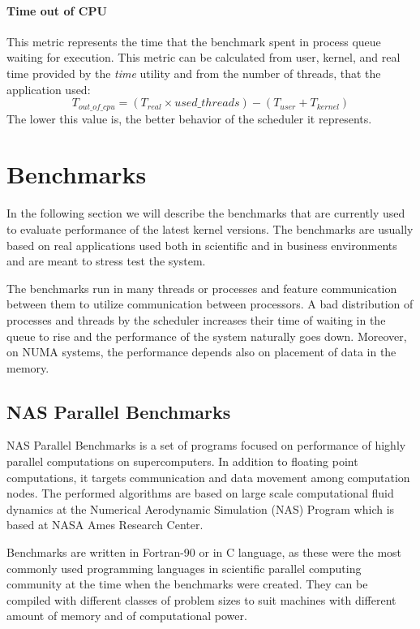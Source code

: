 \paragraph{Time out of CPU} This metric represents the time that the benchmark spent in process
queue waiting for execution. This metric can be calculated from user, kernel, and
real time provided by the \emph{time} utility and from the number of threads, that the
application used:
$$T_{out\_of\_cpu} = (T_{real} \times used\_threads) - (T_{user} + T_{kernel})$$
The lower this value is, the better behavior of the scheduler it represents.

\section{Benchmarks}
In the following section we will describe the benchmarks that are currently used
to evaluate performance of the latest kernel versions. The benchmarks are
usually based on real applications used both in scientific and in business
environments and are meant to stress test the system.

The benchmarks run in many threads or processes and feature communication
between them to utilize communication between processors. A bad distribution of
processes and threads by the scheduler increases their time of waiting in the
queue to rise and the performance of the system naturally goes down. Moreover,
on NUMA systems, the performance depends also on placement of data in the
memory.

\subsection{NAS Parallel Benchmarks}
NAS Parallel Benchmarks\;\cite{nas-parallel} is a set of programs focused on
performance of highly parallel computations on supercomputers. In addition to
floating point computations, it targets communication and data movement among
computation nodes. The performed algorithms are based on large scale
computational fluid dynamics at the Numerical Aerodynamic Simulation (NAS)
Program which is based at NASA Ames Research Center.

Benchmarks are written in Fortran-90 or in C language, as these were the most
commonly used programming languages in scientific parallel computing community
at the time when the benchmarks were created. They can be compiled with
different classes of problem sizes to suit machines with different amount of
memory and of computational power.

